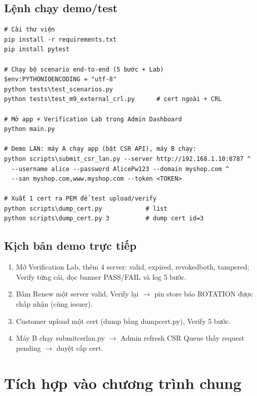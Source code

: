 \documentclass[12pt,a4paper]{article}
\newcommand{\code}[1]{{\ttfamily\small\def\_{\textunderscore\discretionary{}{}{}}#1}}
\begin{document}
\subsection{Lệnh chạy demo/test}

\begin{Verbatim}[numbers=none]
# Cài thư viện
pip install -r requirements.txt
pip install pytest

# Chạy bộ scenario end-to-end (5 bước + Lab)
$env:PYTHONIOENCODING = "utf-8"
python tests\test_scenarios.py
python tests\test_m9_external_crl.py      # cert ngoài + CRL

# Mở app + Verification Lab trong Admin Dashboard
python main.py

# Demo LAN: máy A chạy app (bật CSR API), máy B chạy:
python scripts\submit_csr_lan.py --server http://192.168.1.10:8787 ^
  --username alice --password AlicePw123 --domain myshop.com ^
  --san myshop.com,www.myshop.com --token <TOKEN>

# Xuất 1 cert ra PEM để test upload/verify
python scripts\dump_cert.py            # list
python scripts\dump_cert.py 3          # dump cert id=3
\end{Verbatim}

\subsection{Kịch bản demo trực tiếp}

\begin{enumerate}
  \item Mở Verification Lab, thêm 4 server: \code{valid}, \code{expired},
        \code{revoked\_both}, \code{tampered}; Verify từng cái, đọc banner
        PASS/FAIL và log 5 bước.
  \item Bấm Renew một server \code{valid}, Verify lại $\to$ pin store báo
        ROTATION được chấp nhận (cùng issuer).
  \item Customer upload một cert (dump bằng \code{dump\_cert.py}), Verify 5 bước.
  \item Máy B chạy \code{submit\_csr\_lan.py} $\to$ Admin refresh CSR Queue thấy
        request pending $\to$ duyệt cấp cert.
\end{enumerate}

\section{Tích hợp vào chương trình chung}
\end{document}

